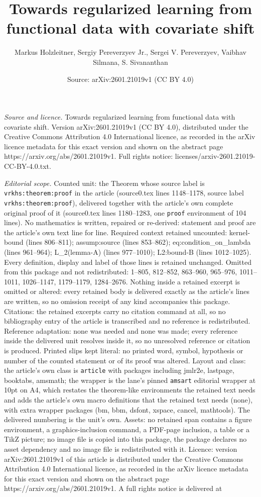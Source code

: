 \documentclass[10pt,a4paper]{amsart}
\title[Towards regularized learning from functional data with covar]{Towards regularized learning from functional data with covariate shift}
\author{Markus Holzleitner, Sergiy Pereverzyev Jr., Sergei V. Pereverzyev, Vaibhav Silmana, S. Sivananthan}
\date{Source: arXiv:2601.21019v1 (CC BY 4.0)}
\begin{document}
\maketitle

\noindent\emph{Source and licence.} Towards regularized learning from functional data with covariate shift. Version arXiv:2601.21019v1 (CC BY 4.0), distributed under the Creative Commons Attribution 4.0 International licence, as recorded in the arXiv licence metadata for this exact version and shown on the abstract page https://arxiv.org/abs/2601.21019v1. Full rights notice: licenses/arxiv-2601.21019-CC-BY-4.0.txt.\par\smallskip

\noindent\textit{Editorial scope.} Counted unit: the Theorem whose source label is \texttt{vrkhs:theorem:proof} in the article (source0.tex lines 1148--1178, source label \texttt{vrkhs:theorem:proof}), delivered together with the article's own complete original proof of it (source0.tex lines 1180--1283, one \texttt{proof} environment of 104 lines). No mathematics is written, repaired or re-derived: statement and proof are the article's own text line for line. Required context retained uncounted: kernel-bound (lines 806--811); assump:source (lines 853--862); eq:condition\_on\_lambda (lines 961--964); L\_2(lemma-A) (lines 977--1010); L2:bound-B (lines 1012--1025). Every definition, display and label of those lines is retained unchanged. Omitted from this package and not redistributed: 1--805, 812--852, 863--960, 965--976, 1011--1011, 1026--1147, 1179--1179, 1284--2676. Nothing inside a retained excerpt is omitted or altered: every retained body is delivered exactly as the article's lines are written, so no omission receipt of any kind accompanies this package. Citations: the retained excerpts carry no citation command at all, so no bibliography entry of the article is transcribed and no reference is redistributed. Reference adaptation: none was needed and none was made; every reference inside the delivered unit resolves inside it, so no unresolved reference or citation is produced. Printed slips kept literal: no printed word, symbol, hypothesis or number of the counted statement or of its proof was altered. Layout and class: the article's own class is \texttt{article} with packages including jmlr2e, lastpage, booktabs, amsmath; the wrapper is the lane's pinned \texttt{amsart} editorial wrapper at 10pt on A4, which restates the theorem-like environments the retained text needs and adds the article's own macro definitions that the retained text needs (none), with extra wrapper packages (bm, bbm, dsfont, xspace, cancel, mathtools). The delivered numbering is the unit's own. Assets: no retained span contains a figure environment, a graphics-inclusion command, a PDF-page inclusion, a table or a TikZ picture; no image file is copied into this package, the package declares no asset dependency and no image file is redistributed with it. Licence: version arXiv:2601.21019v1 of this article is distributed under the Creative Commons Attribution 4.0 International licence, as recorded in the arXiv licence metadata for this exact version and shown on the abstract page https://arxiv.org/abs/2601.21019v1. A full rights notice is delivered at 
\end{document}
